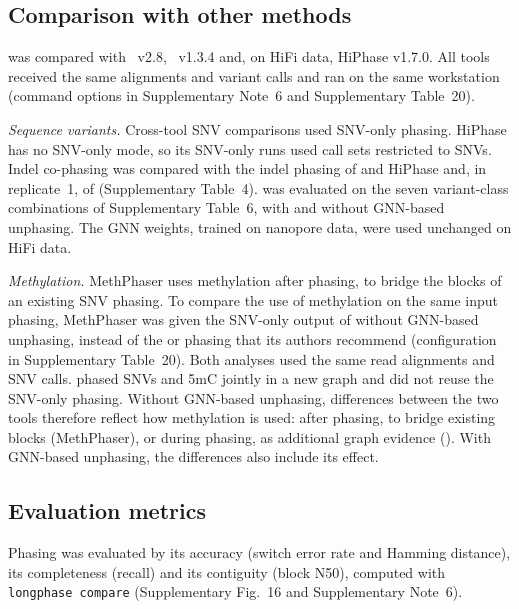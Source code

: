 \subsection*{Comparison with other methods}
\toolname was compared with \whatshap~v2.8\cite{patterson2015whatshap}, \hapcut~v1.3.4\cite{edge2017hapcut2} and, on HiFi data, HiPhase v1.7.0\cite{holt2024hiphase}.  All tools received the same alignments and variant calls and ran on the same workstation (command options in Supplementary Note~6 and Supplementary Table~20).

\emph{Sequence variants.}  Cross-tool SNV comparisons used SNV-only phasing.  HiPhase has no SNV-only mode, so its SNV-only runs used call sets restricted to SNVs.  Indel co-phasing was compared with the indel phasing of \whatshap and HiPhase and, in replicate~1, of \hapcut (Supplementary Table~4).  \toolname was evaluated on the seven variant-class combinations of Supplementary Table~6, with and without GNN-based unphasing.  The GNN weights, trained on nanopore data, were used unchanged on HiFi data.

\emph{Methylation.}  MethPhaser\cite{fu2024methphaser} uses methylation after phasing, to bridge the blocks of an existing SNV phasing.  To compare the use of methylation on the same input phasing, MethPhaser was given the SNV-only output of \toolname without GNN-based unphasing, instead of the \whatshap or \hapcut phasing that its authors recommend (configuration in Supplementary Table~20).  Both analyses used the same read alignments and SNV calls.  \toolname phased SNVs and 5mC jointly in a new graph and did not reuse the SNV-only phasing.  Without GNN-based unphasing, differences between the two tools therefore reflect how methylation is used: after phasing, to bridge existing blocks (MethPhaser), or during phasing, as additional graph evidence (\toolname).  With GNN-based unphasing, the differences also include its effect.

\subsection*{Evaluation metrics}
Phasing was evaluated by its accuracy (switch error rate and Hamming distance), its completeness (recall) and its contiguity (block N50), computed with \texttt{longphase compare} (Supplementary Fig.~16 and Supplementary Note~6).

